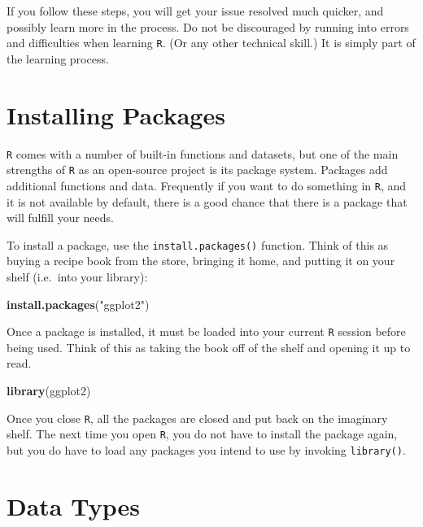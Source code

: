 \documentclass[]{book}
\newenvironment{Shaded}{\begin{snugshade}}{\end{snugshade}}
\newcommand{\KeywordTok}[1]{\textcolor[rgb]{0.13,0.29,0.53}{\textbf{#1}}}
\newcommand{\StringTok}[1]{\textcolor[rgb]{0.31,0.60,0.02}{#1}}
\newcommand{\NormalTok}[1]{#1}
\theoremstyle{definition}
\theoremstyle{definition}
\theoremstyle{definition}
\theoremstyle{remark}
\begin{document}
If you follow these steps, you will get your issue resolved much
quicker, and possibly learn more in the process. Do not be discouraged
by running into errors and difficulties when learning \texttt{R}. (Or
any other technical skill.) It is simply part of the learning process.

\section{Installing Packages}\label{installing-packages}

\texttt{R} comes with a number of built-in functions and datasets, but
one of the main strengths of \texttt{R} as an open-source project is its
package system. Packages add additional functions and data. Frequently
if you want to do something in \texttt{R}, and it is not available by
default, there is a good chance that there is a package that will
fulfill your needs.

To install a package, use the \texttt{install.packages()} function.
Think of this as buying a recipe book from the store, bringing it home,
and putting it on your shelf (i.e.~into your library):

\begin{Shaded}
\begin{Highlighting}[]
\KeywordTok{install.packages}\NormalTok{(}\StringTok{"ggplot2"}\NormalTok{)}
\end{Highlighting}
\end{Shaded}

Once a package is installed, it must be loaded into your current
\texttt{R} session before being used. Think of this as taking the book
off of the shelf and opening it up to read.

\begin{Shaded}
\begin{Highlighting}[]
\KeywordTok{library}\NormalTok{(ggplot2)}
\end{Highlighting}
\end{Shaded}

Once you close \texttt{R}, all the packages are closed and put back on
the imaginary shelf. The next time you open \texttt{R}, you do not have
to install the package again, but you do have to load any packages you
intend to use by invoking \texttt{library()}.

\section{Data Types}\label{data-types}
\end{document}
